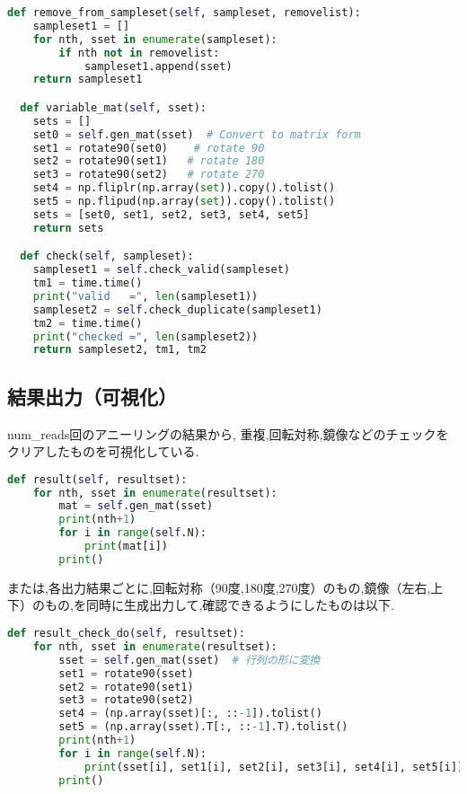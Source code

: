 \documentclass[uplatex,dvipdfmx,a4paper,11pt,oneside,openany]{jsbook}
\begin{document}
\begin{lstlisting}[language=Python]
  def remove_from_sampleset(self, sampleset, removelist):
    sampleset1 = []
    for nth, sset in enumerate(sampleset):
        if nth not in removelist:
            sampleset1.append(sset)
    return sampleset1

  def variable_mat(self, sset):
    sets = []
    set0 = self.gen_mat(sset)  # Convert to matrix form
    set1 = rotate90(set0)    # rotate 90
    set2 = rotate90(set1)   # rotate 180
    set3 = rotate90(set2)   # rotate 270
    set4 = np.fliplr(np.array(set)).copy().tolist()
    set5 = np.flipud(np.array(set)).copy().tolist()
    sets = [set0, set1, set2, set3, set4, set5]
    return sets

  def check(self, sampleset):
    sampleset1 = self.check_valid(sampleset)
    tm1 = time.time()
    print("valid   =", len(sampleset1))
    sampleset2 = self.check_duplicate(sampleset1)
    tm2 = time.time()
    print("checked =", len(sampleset2))
    return sampleset2, tm1, tm2
\end{lstlisting}

\subsection{結果出力（可視化）}

num\_reads回のアニーリングの結果から, 重複,回転対称,鏡像などのチェックをクリアしたものを可視化している.

\begin{lstlisting}[language=Python]
  def result(self, resultset):
    for nth, sset in enumerate(resultset):
        mat = self.gen_mat(sset)
        print(nth+1)
        for i in range(self.N):
            print(mat[i])
        print()
\end{lstlisting}

または,各出力結果ごとに,回転対称（90度,180度,270度）のもの,鏡像（左右,上下）のもの,を同時に生成出力して,確認できるようにしたものは以下.

\begin{lstlisting}[language=Python]
  def result_check_do(self, resultset):
    for nth, sset in enumerate(resultset):
        sset = self.gen_mat(sset)  # 行列の形に変換
        set1 = rotate90(sset)
        set2 = rotate90(set1)
        set3 = rotate90(set2)
        set4 = (np.array(sset)[:, ::-1]).tolist()
        set5 = (np.array(sset).T[:, ::-1].T).tolist()
        print(nth+1)
        for i in range(self.N):
            print(sset[i], set1[i], set2[i], set3[i], set4[i], set5[i])
        print()
\end{lstlisting}
\end{document}
